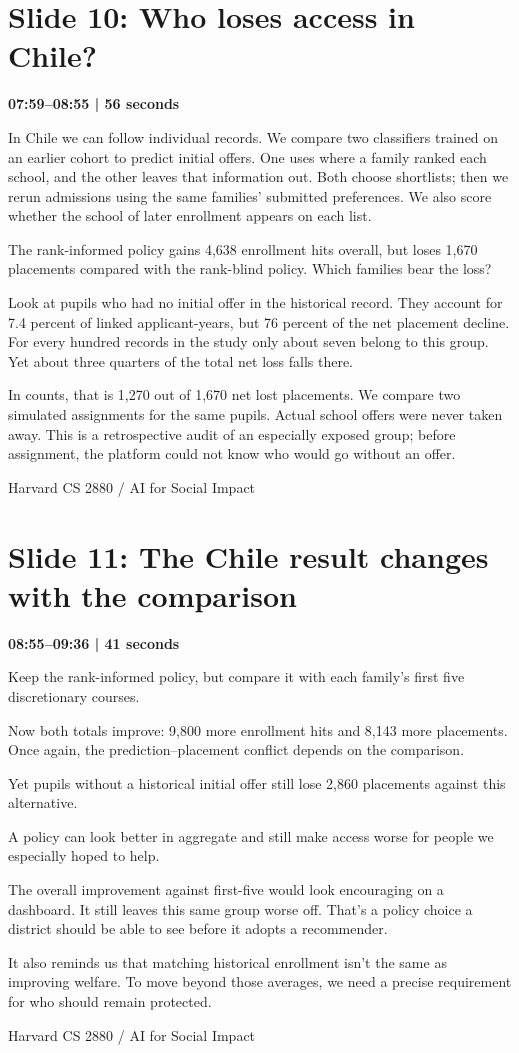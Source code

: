 \documentclass[11pt]{article}
\begin{document}
\section*{Slide 10: Who loses access in Chile?}
{\color{navy}\textbf{07:59--08:55 | 56 seconds}}\par\medskip
In Chile we can follow individual records. We compare two classifiers trained on an earlier cohort to predict initial offers. One uses where a family ranked each school, and the other leaves that information out. Both choose shortlists; then we rerun admissions using the same families' submitted preferences. We also score whether the school of later enrollment appears on each list.
\par
The rank-informed policy gains 4,638 enrollment hits overall, but loses 1,670 placements compared with the rank-blind policy. Which families bear the loss?
\par
Look at pupils who had no initial offer in the historical record. They account for 7.4 percent of linked applicant-years, but 76 percent of the net placement decline. For every hundred records in the study only about seven belong to this group. Yet about three quarters of the total net loss falls there.
\par
In counts, that is 1,270 out of 1,670 net lost placements. We compare two simulated assignments for the same pupils. Actual school offers were never taken away. This is a retrospective audit of an especially exposed group; before assignment, the platform could not know who would go without an offer.
\par
\newpage
{\small Harvard CS 2880 / AI for Social Impact}\par
\section*{Slide 11: The Chile result changes with the comparison}
{\color{navy}\textbf{08:55--09:36 | 41 seconds}}\par\medskip
Keep the rank-informed policy, but compare it with each family's first five discretionary courses.
\par
Now both totals improve: 9,800 more enrollment hits and 8,143 more placements. Once again, the prediction--placement conflict depends on the comparison.
\par
Yet pupils without a historical initial offer still lose 2,860 placements against this alternative.
\par
A policy can look better in aggregate and still make access worse for people we especially hoped to help.
\par
The overall improvement against first-five would look encouraging on a dashboard. It still leaves this same group worse off. That's a policy choice a district should be able to see before it adopts a recommender.
\par
It also reminds us that matching historical enrollment isn't the same as improving welfare. To move beyond those averages, we need a precise requirement for who should remain protected.
\par
\newpage
{\small Harvard CS 2880 / AI for Social Impact}\par
\end{document}

